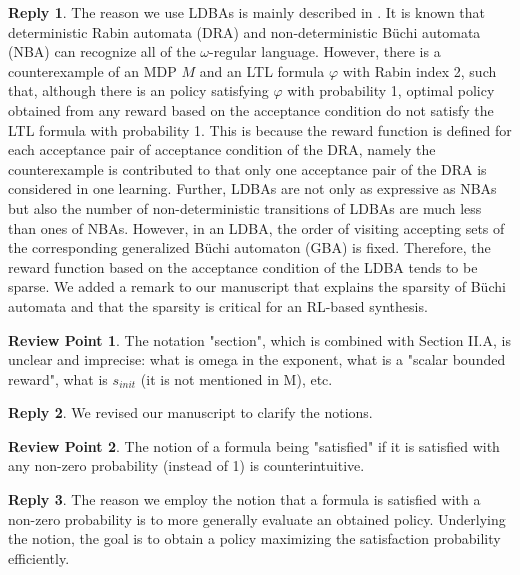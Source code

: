\documentclass[10 pt, dvipdfmx]{article}
\theoremstyle{definition}
\newtheorem{review point}{Review Point}[section]
\newtheorem*{reply}{Reply}
\begin{document}
\begin{reply}
  The reason we use LDBAs is mainly described in \cite{Hahn2019}. It is known that deterministic Rabin automata (DRA) and non-deterministic B\"{u}chi automata (NBA) can recognize all of the $\omega$-regular language. However, there is a counterexample of an MDP $M$ and an LTL formula $\varphi$ with Rabin index 2, such that, although there is an policy satisfying $\varphi$ with probability 1, optimal policy obtained from any reward based on the acceptance condition do not satisfy the LTL formula with probability 1. This is because the reward function is defined for each acceptance pair of acceptance condition of the DRA, namely the counterexample is contributed to that only one acceptance pair of the DRA is considered in one learning. Further, LDBAs are not only as expressive as NBAs but also the number of non-deterministic transitions of LDBAs are much less than ones of NBAs.
  However, in an LDBA, the order of visiting accepting sets of the corresponding generalized B\"{u}chi automaton (GBA) is fixed. Therefore, the reward function based on the acceptance condition of the LDBA tends to be sparse. We added a remark to our manuscript that explains the sparsity of B\"{u}chi automata and that the sparsity is critical for an RL-based synthesis.
\end{reply}

\begin{review point}
  The notation "section", which is combined with Section II.A, is
unclear and imprecise: what is omega in the exponent, what is a "scalar
bounded reward", what is $s_{init}$ (it is not mentioned in M), etc.
\end{review point}

\begin{reply}
  We revised our manuscript to clarify the notions.
\end{reply}

\begin{review point}
  The notion of a formula being "satisfied" if it is satisfied with any
non-zero probability (instead of 1) is counterintuitive.
\end{review point}

\begin{reply}
  The reason we employ the notion that a formula is satisfied with a non-zero probability is to more generally evaluate an obtained policy. Underlying the notion, the goal is to obtain a policy maximizing the satisfaction probability efficiently.
\end{reply}
\end{document}
